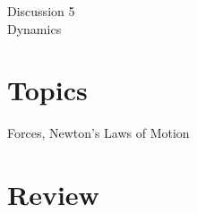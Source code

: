 \documentclass[11pt]{article}
\theoremstyle{gangnamstyle}{\newtheorem{definition}{Definition}[]}
\theoremstyle{gangnamstyle}{\newtheorem{example}{Example}[]}
\theoremstyle{gangnamstyle}{\newtheorem{problem}{Problem}[]}
\begin{document}
\normalfont
\pagestyle{pages}


\begin{center}
\vspace{3in}
{\Large Discussion 5 } \\ [0.05in]
Dynamics \\ [-0.5in]
\end{center}

\section*{Topics}
Forces, Newton's Laws of Motion

\section{Review}
\end{document}

